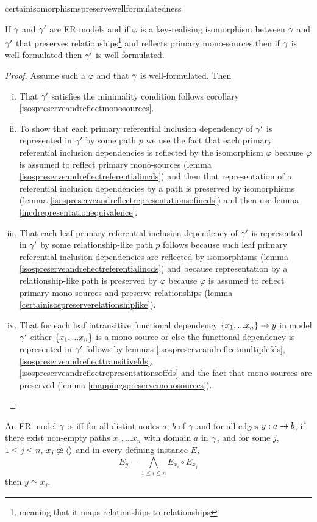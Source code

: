 certainisomorphismspreservewellformulatedness
\begin{lemma}
\label{certainisomorphismspreservewellformulatedness}
If $\gamma$ and $\gamma'$ are ER models and  if  $\varphi$ is a key-realising isomorphism between $\gamma$  and $\gamma'$ that preserves relationships\footnote{meaning that it maps relationships to relationships} and reflects primary mono-sources then if $\gamma$ is well-formulated then $\gamma'$ is well-formulated.
\end{lemma}
\begin{proof}
Assume such a $\varphi$ and that $\gamma$ is well-formulated. Then
\begin{enumerate} [(i)]
\item{
That $\gamma'$ satisfies the minimality condition follows corollary \ref{isospreserveandreflectmonosources}.
}
\item{ 
To show that each primary referential inclusion dependency of $\gamma'$ is represented in $\gamma'$ by some path $p$ we use the fact that each primary referential inclusion dependencies is reflected
by the isomorphism $\varphi$ because $\varphi$ is assumed to reflect primary mono-sources (lemma \ref{isospreserveandreflectreferentialincds}) and then that representation of a referential inclusion dependencies by a path is  preserved by isomorphisms (lemma \ref{isospreserveandreflectrepresentationsofincds})
and then use lemma \ref{incdrepresentationequivalence}.
}
\item{ 
That each leaf primary referential inclusion dependency of $\gamma'$ is represented in $\gamma'$ by some relationship-like path $p$
follows because such leaf primary referential inclusion dependencies are reflected by isomorphisms
(lemma \ref{isospreserveandreflectreferentialincds})
 and because  representation by a relationship-like path is preserved 
by $\varphi$  because $\varphi$ is assumed to reflect primary mono-sources and preserve relationships (lemma \ref{certainisospreserverelationshiplike}).

}
\item{
That for each leaf intransitive functional dependency $\left\{x_1,...x_n\right\} \rightarrow y$ in model $\gamma'$
either $\left\{x_1,...x_n\right\}$ is a mono-source 
or else the functional dependency is represented in $\gamma'$ 
follows by lemmas \ref{isospreserveandreflectmultiplefds}, \ref{isospreserveandreflecttransitivefds},
\ref{isospreserveandreflectrepresentationsoffds} and the fact that mono-sources are preserved (lemma \ref{mappingspreservemonosources}).
}
\end{enumerate}
\end{proof}
\begin{definition}
An ER model $\gamma$ is  iff for all distint nodes $a$, $b$ of $\gamma$ and for all edges $y: a \rightarrow b$, if there exist non-empty paths $x_1,...x_n$   with domain $a$ in $\gamma$,  and for some $j$, $1 \leq j \leq n$, $x_j \not\simeq \langle\rangle$ and in every defining instance $E$,  
$$E_y = \bigwedge_{1 \leq i \leq n}{\overline{E_{x_i}}} \circ E_{x_j}$$
then $y \simeq x_j$.
\end{definition}

